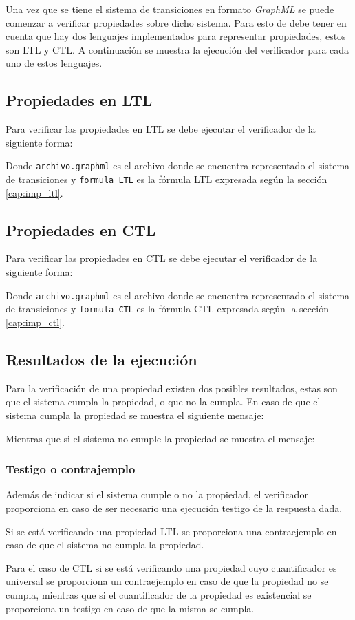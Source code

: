 Una vez que se tiene el sistema de transiciones en formato \textit{GraphML} se puede comenzar
 a verificar propiedades sobre dicho sistema.
Para esto de debe tener en cuenta que hay dos lenguajes implementados para representar propiedades,
 estos son LTL y CTL.
A continuación se muestra la ejecución del verificador para cada uno de estos lenguajes.

\subsection{Propiedades en LTL}
Para verificar las propiedades en LTL se debe ejecutar el verificador de la siguiente forma:

\fbox{\parbox{\textwidth}{\scriptsize}}

Donde \texttt{archivo.graphml} es el archivo donde se encuentra representado el sistema de
 transiciones y \texttt{formula LTL} es la fórmula LTL expresada según la sección \ref{cap:imp_ltl}.


\subsection{Propiedades en CTL}
Para verificar las propiedades en CTL se debe ejecutar el verificador de la siguiente forma:

\fbox{\parbox{\textwidth}{\scriptsize}}

Donde \texttt{archivo.graphml} es el archivo donde se encuentra representado el sistema de
 transiciones y \texttt{formula CTL} es la fórmula CTL expresada según la sección \ref{cap:imp_ctl}.

\subsection{Resultados de la ejecución}
Para la verificación de una propiedad existen dos posibles resultados, estas son que el sistema
cumpla la propiedad, o que no la cumpla.
En caso de que el sistema cumpla la propiedad se muestra el siguiente mensaje:
\fbox{\parbox{\textwidth}{\scriptsize}}

Mientras que si el sistema no cumple la propiedad se muestra el mensaje:
\fbox{\parbox{\textwidth}{\scriptsize}}

\subsubsection{Testigo o contrajemplo}
Además de indicar si el sistema cumple o no la propiedad, el verificador proporciona
 en caso de ser necesario una ejecución testigo de la respuesta dada.

Si se está verificando una propiedad LTL se proporciona una contraejemplo en caso de
 que el sistema no cumpla la propiedad.

Para el caso de CTL si se está verificando una propiedad cuyo cuantificador es universal
 se proporciona un contraejemplo en caso de que la propiedad no se cumpla, mientras que
 si el cuantificador de la propiedad es existencial se proporciona un testigo en caso
 de que la misma se cumpla.
